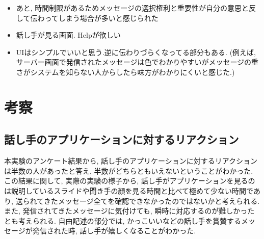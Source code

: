 \documentclass{funthesis}
\begin{document}
\begin{itemize}
 \item あと,  時間制限があるためメッセージの選択権利と重要性が自分の意思と反して伝わってしまう場合が多いと感じられた\\
 \item 話し手が見る画面. Helpが欲しい\\
 \item UIはシンプルでいいと思う.逆に伝わりづらくなってる部分もある. (例えば, サーバー画面で発信されたメッセージは色でわかりやすいがメッセージの重さがシステムを知らない人からしたら味方がわかりにくいと感じた.)\\
\end{itemize}










\chapter{考察}
\section{話し手のアプリケーションに対するリアクション}
本実験のアンケート結果から, 話し手のアプリケーションに対するリアクションは半数の人があったと答え, 半数がどちらともいえないということがわかった. この結果に関して, 実際の実験の様子から, 話し手がアプリケーションを見るのは説明しているスライドや聞き手の顔を見る時間と比べて極めて少ない時間であり, 送られてきたメッセージ全てを確認できなかったのではないかと考えられる. また, 発信されてきたメッセージに気付けても, 瞬時に対応するのが難しかったとも考えられる. 自由記述の部分では, かっこいいなどの話し手を賞賛するメッセージが発信された時, 話し手が嬉しくなることがわかった. 
\end{document}
